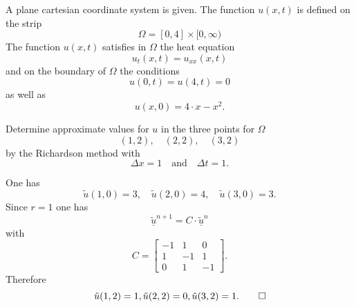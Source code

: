 A plane cartesian coordinate system is given.
The function $u(x,t)$ is defined on the strip 
\[
\Omega = [0, 4] \times [0,\infty)
\]
The function $u(x,t)$ satisfies in $\Omega$ the heat equation
\[
u_{t}(x,t) = u_{xx}(x,t)
\]
and on the boundary of $\Omega$ the conditions 
\[
u(0,t) = u(4,t) = 0
\]
as well as
\[
u(x,0) = 4 \cdot x - x^2.
\]

Determine approximate values for $u$ in the three points for
$\Omega$
\[
(1,2), \quad  (2,2), \quad (3,2)
\]
by the Richardson method with 
\[
\Delta x = 1 \quad \text{and} \quad  \Delta t = 1.
\]

\begin{loesung}
One has
\[
\tilde u(1,0) = 3,\quad \tilde u(2,0) = 4,\quad \tilde u(3,0) = 3.
\]
Since $r = 1$ one has
\[
\underline{\tilde u}^{n+1}
=
C \cdot \underline{\tilde u}^{n}
\]
with
\[
C = \left[\begin{array}{rrr} -1 & 1 & 0  \\ 1 & -1 & 1 \\ 0 & 1 & -1 \end{array}\right].
\]
Therefore
\[
\tilde u(1,2) = 1, \tilde u(2,2) = 0, \tilde u(3,2) = 1.
\qedhere
\]
\end{loesung}


